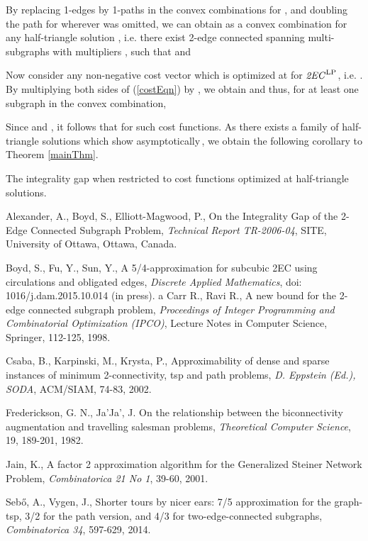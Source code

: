 \documentclass[oneeqnum,final]{siamltex1213}
\newcommand{\TwoEC}{\emph{2EC}}
\newcommand{\TwoECLP}{\ensuremath{\text{\TwoEC}^{\text{LP}}}}
\begin{document}
By replacing 1-edges by 1-paths in the convex combinations for , and doubling the path for  wherever  was omitted, we can obtain  as a convex combination for any half-triangle solution , i.e. there exist \mbox{2-edge} connected spanning multi-subgraphs  with multipliers ,  such that  and 

Now consider any non-negative cost vector  which is optimized at  for \TwoECLP{}, i.e. . By multiplying both sides of (\ref{costEqn}) by , we obtain  and thus, for at least one subgraph  in the convex combination,

Since  and , it follows that  for such cost functions. As there exists a family of half-triangle solutions which show  asymptotically\,\cite{alexander}, we obtain the following corollary to Theorem \ref{mainThm}.

\begin{corollary}
The integrality gap  when restricted to cost functions optimized at half-triangle solutions.
\end{corollary}

\begin{thebibliography}{10}\label{bibliography}

 Alexander, A., Boyd, S., Elliott-Magwood, P., On the Integrality Gap of the 2-Edge Connected Subgraph Problem,  \emph{Technical Report TR-2006-04}, SITE, University of Ottawa, Ottawa, Canada.

 Boyd, S., Fu, Y., Sun, Y., A 5/4-approximation for subcubic 2EC using circulations and obligated edges, \emph{Discrete Applied Mathematics}, doi:\,1016/j.dam.2015.10.014 (in press).
a
 Carr R., Ravi R., A new bound for the 2-edge connected subgraph problem, \emph{Proceedings of Integer Programming and Combinatorial Optimization (IPCO)}, Lecture Notes in Computer Science, Springer, 112-125, 1998.

 Csaba, B., Karpinski, M., Krysta, P., Approximability of dense and sparse instances of minimum 2-connectivity, tsp and path problems, \emph{D. Eppstein (Ed.),
SODA}, ACM/SIAM, 74-83, 2002.

 Frederickson, G. N., Ja'Ja', J. On the relationship between the biconnectivity augmentation and travelling salesman problems, \emph{Theoretical Computer Science}, 19, 189-201, 1982.

 Jain, K., A factor 2 approximation algorithm for the Generalized Steiner Network Problem, \emph{Combinatorica 21 No 1}, 39-60, 2001.

 Sebő, A., Vygen, J., Shorter tours by nicer ears: 7/5 approximation for the graph-tsp, 3/2 for the path version, and 4/3 for two-edge-connected subgraphs, \emph{Combinatorica 34}, 597-629, 2014.

\end{thebibliography}
\end{document}
